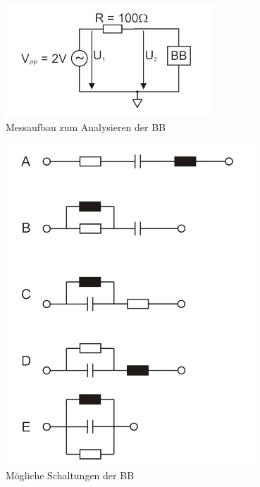 \documentclass[10pt]{scrreprt}
\begin{document}
        \begin{center}
            \begin{figure}[H]
                \includegraphics[width=\textwidth]{Abbildung20.png}
                \caption{Messaufbau zum Analysieren der BB}
                \label{fig:abb20}
            \end{figure}
            \begin{figure}[H]
                \includegraphics[width=\textwidth]{Abbildung21.png}
                \caption{Mögliche Schaltungen der BB}
                \label{fig:abb21}
            \end{figure}
        \end{center}
\end{document}

